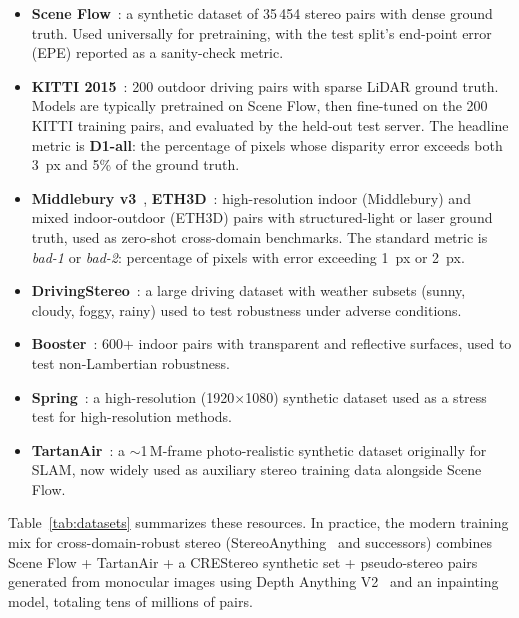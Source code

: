\begin{itemize}
\item \textbf{Scene Flow}~\cite{mayer2016sceneflow}: a synthetic dataset of 35\,454 stereo pairs with dense ground truth. Used universally for pretraining, with the test split's end-point error (EPE) reported as a sanity-check metric.
\item \textbf{KITTI 2015}~\cite{menze2015kitti}: 200 outdoor driving pairs with sparse LiDAR ground truth. Models are typically pretrained on Scene Flow, then fine-tuned on the 200 KITTI training pairs, and evaluated by the held-out test server. The headline metric is \textbf{D1-all}: the percentage of pixels whose disparity error exceeds both 3~px and 5\% of the ground truth.
\item \textbf{Middlebury v3}~\cite{scharstein2014middlebury}, \textbf{ETH3D}~\cite{schops2017eth3d}: high-resolution indoor (Middlebury) and mixed indoor-outdoor (ETH3D) pairs with structured-light or laser ground truth, used as zero-shot cross-domain benchmarks. The standard metric is \emph{bad-1} or \emph{bad-2}: percentage of pixels with error exceeding 1~px or 2~px.
\item \textbf{DrivingStereo}~\cite{yang2019drivingstereo}: a large driving dataset with weather subsets (sunny, cloudy, foggy, rainy) used to test robustness under adverse conditions.
\item \textbf{Booster}~\cite{ramirez2022booster}: 600+ indoor pairs with transparent and reflective surfaces, used to test non-Lambertian robustness.
\item \textbf{Spring}~\cite{mehl2023spring}: a high-resolution (1920$\times$1080) synthetic dataset used as a stress test for high-resolution methods.
\item \textbf{TartanAir}~\cite{wang2020tartanair}: a $\sim$1\,M-frame photo-realistic synthetic dataset originally for SLAM, now widely used as auxiliary stereo training data alongside Scene Flow.
\end{itemize}

Table~\ref{tab:datasets} summarizes these resources. In practice, the modern training mix for cross-domain-robust stereo (StereoAnything~\cite{guo2024stereoanything} and successors) combines Scene Flow + TartanAir + a CREStereo synthetic set + pseudo-stereo pairs generated from monocular images using Depth Anything V2~\cite{yang2024dav2} and an inpainting model, totaling tens of millions of pairs.




